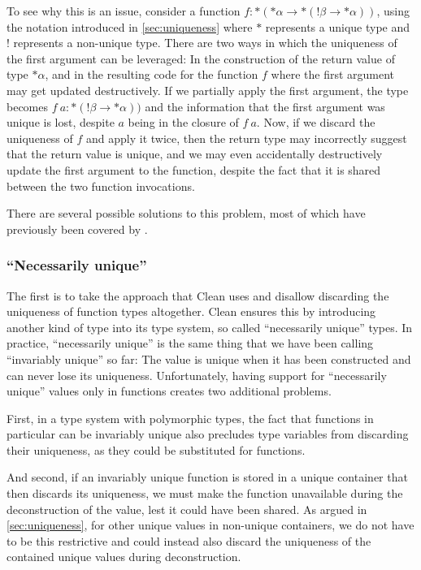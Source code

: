 To see why this is an issue, consider a function $f : *(*\alpha \to *(!\beta \to *\alpha))$, using the notation introduced in \cref{sec:uniqueness} where $*$ represents a unique type and $!$ represents a non-unique type. There are two ways in which the uniqueness of the first argument can be leveraged: In the construction of the return value of type $*\alpha$, and in the resulting code for the function $f$ where the first argument may get updated destructively. If we partially apply the first argument, the type becomes $f\ a : *(!\beta \to *\alpha))$ and the information that the first argument was unique is lost, despite $a$ being in the closure of $f\ a$. Now, if we discard the uniqueness of $f$ and apply it twice, then the return type may incorrectly suggest that the return value is unique, and we may even accidentally destructively update the first argument to the function, despite the fact that it is shared between the two function invocations.

There are several possible solutions to this problem, most of which have previously been covered by \cite{de_vries_making_2009}. 

\subsubsection{``Necessarily unique''}
The first is to take the approach that Clean uses and disallow discarding the uniqueness of function types altogether. Clean ensures this by introducing another kind of type into its type system, so called ``necessarily unique'' types. In practice, ``necessarily unique'' is the same thing that we have been calling ``invariably unique'' so far: The value is unique when it has been constructed and can never lose its uniqueness. Unfortunately, having support for ``necessarily unique'' values only in functions creates two additional problems.

First, in a type system with polymorphic types, the fact that functions in particular can be invariably unique also precludes type variables from discarding their uniqueness, as they could be substituted for functions.

And second, if an invariably unique function is stored in a unique container that then discards its uniqueness, we must make the function unavailable during the deconstruction of the value, lest it could have been shared. As argued in \cref{sec:uniqueness}, for other unique values in non-unique containers, we do not have to be this restrictive and could instead also discard the uniqueness of the contained unique values during deconstruction.

